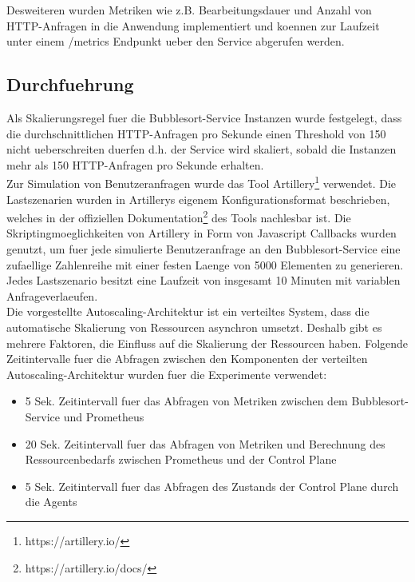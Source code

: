 \documentclass[runningheads]{llncs}
\begin{document}
Desweiteren wurden Metriken wie z.B. Bearbeitungsdauer und Anzahl von HTTP-Anfragen in die Anwendung implementiert und koennen zur Laufzeit unter einem /metrics Endpunkt ueber den Service abgerufen werden.

\subsection{Durchfuehrung}

Als Skalierungsregel fuer die Bubblesort-Service Instanzen wurde festgelegt, dass die durchschnittlichen HTTP-Anfragen pro Sekunde einen Threshold von 150 nicht ueberschreiten duerfen d.h. der Service  wird skaliert, sobald die Instanzen mehr als 150 HTTP-Anfragen pro Sekunde erhalten. \\

Zur Simulation von Benutzeranfragen wurde das Tool Artillery\footnote{https://artillery.io/} verwendet. Die Lastszenarien wurden in Artillerys eigenem Konfigurationsformat beschrieben, welches  in der offiziellen Dokumentation\footnote{https://artillery.io/docs/} des Tools nachlesbar ist. Die Skriptingmoeglichkeiten von Artillery in Form von Javascript Callbacks  wurden genutzt, um fuer jede simulierte Benutzeranfrage an den Bubblesort-Service eine zufaellige Zahlenreihe mit einer festen Laenge von 5000 Elementen zu generieren. Jedes Lastszenario besitzt eine Laufzeit von insgesamt 10 Minuten mit variablen Anfrageverlaeufen.\\

Die vorgestellte Autoscaling-Architektur ist ein verteiltes System, dass die automatische Skalierung von Ressourcen asynchron umsetzt. Deshalb gibt es mehrere Faktoren, die Einfluss auf die Skalierung der Ressourcen haben. Folgende Zeitintervalle fuer die Abfragen zwischen den Komponenten der verteilten Autoscaling-Architektur wurden fuer die Experimente verwendet: 

 \begin{itemize}
	\item  5 Sek. Zeitintervall fuer das Abfragen von Metriken zwischen dem Bubblesort-Service und Prometheus
	\item  20 Sek. Zeitintervall fuer das Abfragen von Metriken und Berechnung des Ressourcenbedarfs zwischen Prometheus und der Control Plane
	\item  5 Sek. Zeitintervall fuer das Abfragen des Zustands der Control Plane durch die Agents
\end{itemize}
\end{document}
